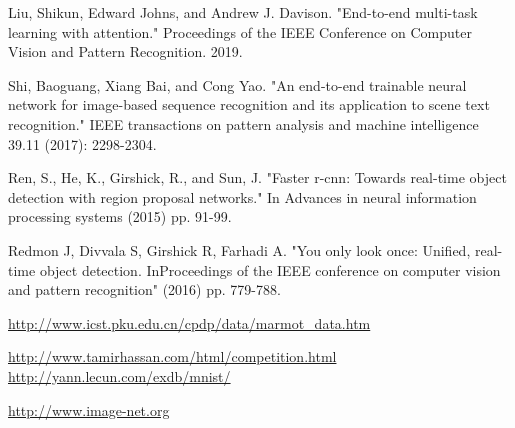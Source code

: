 \documentclass[journal]{IEEEtran}
\begin{document}
\begin{thebibliography}{1}
Liu, Shikun, Edward Johns, and Andrew J. Davison. "End-to-end multi-task learning with attention." Proceedings of the IEEE Conference on Computer Vision and Pattern Recognition. 2019.

Shi, Baoguang, Xiang Bai, and Cong Yao. "An end-to-end trainable neural network for image-based sequence recognition and its application to scene text recognition." IEEE transactions on pattern analysis and machine intelligence 39.11 (2017): 2298-2304.

Ren, S., He, K., Girshick, R., and Sun, J. "Faster r-cnn: Towards real-time object detection with region proposal networks."  In Advances in neural information processing systems (2015) pp. 91-99.

Redmon J, Divvala S, Girshick R, Farhadi A. "You only look once: Unified, real-time object detection. InProceedings of the IEEE conference on computer vision and pattern recognition"  (2016)  pp. 779-788.

\url {http://www.icst.pku.edu.cn/cpdp/data/marmot_data.htm}

\url{http://www.tamirhassan.com/html/competition.html}
\url{http://yann.lecun.com/exdb/mnist/}

\url{http://www.image-net.org}

\end{thebibliography}

% 







\end{document}
